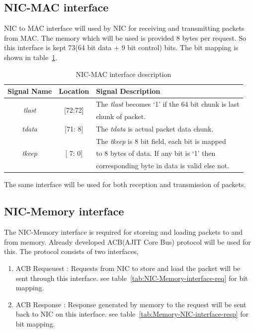 \documentclass[12pt]{report}
\begin{document}
		\subsection{NIC-MAC interface}
			NIC to MAC interface will used by NIC for receiving and transmitting packets from MAC. The memory which will be used is provided 8 bytes per request.
			So this interface is kept 73(64 bit data + 9 bit control) bits. The bit mapping is shown in table~\ref{tab:NIC-MAC-interface}.
				\begin{table}[!htbp]
					\centering
					\begin{tabular}{ccl}
						\hline
						\textbf{Signal Name} & \textbf{Location} &\textbf{Signal Description}  \\ \hline
						\multirow{2}{*}{\textit{tlast}}	& \multirow{2}{*}{[72:72]}	& The \textit{tlast} becomes `1' if the 64 bit chunk is last\\
										& 				& chunk of packet.\\ \hline
						\textit{tdata}   		& [71: 8] 			& The \textit{tdata} is actual packet data chunk.\\ \hline
						\multirow{3}{*}{\textit{tkeep}}	& \multirow{3}{*}{[ 7: 0]}	& The \textit{tkeep} is 8 bit field, each bit is mapped\\
										&				& to 8 bytes of data. If any bit is `1' then\\
										& 				& corresponding byte in data is valid else not.\\ \hline 
					\end{tabular}
					\caption{NIC-MAC interface description}
					\label{tab:NIC-MAC-interface}
				\end{table}
			The same interface will be used for both reception and transmission of packets.

		\subsection{NIC-Memory interface}
			The NIC-Memory interface is required for storeing and loading packets to and from memory. Already developed ACB(AJIT Core Bus) protocol will be used for this.
                        The protocol consists of two interfaces,
			\begin{enumerate}
				\item ACB Requeuest : Requests from NIC to store and load the packet will be sent through this interface. see table~\ref{tab:NIC-Memory-interface-req} for bit mapping.
				\item ACB Response : Response generated by memory to the request will be sent back to NIC on this interface. see table~\ref{tab:Memory-NIC-interface-resp} for bit mapping.
			\end{enumerate}
\end{document}
